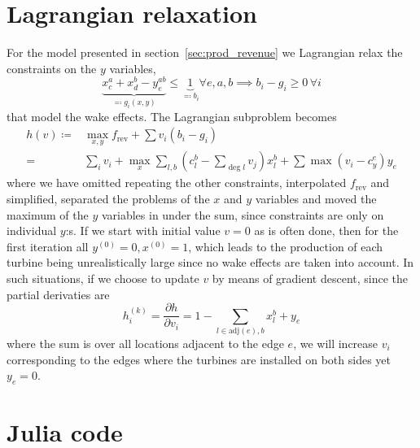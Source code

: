 \documentclass{article}
\begin{document}
\section{Lagrangian relaxation}
For the model presented in section~\ref{sec:prod_revenue}
we Lagrangian relax the constraints on the $y$ variables,
$$ \underbrace{x_c^a + x_d^b - y_e^{ab}}_{\eqqcolon g_i(x, y)} \le \underbrace1_{\eqqcolon b_i} \forall e, a, b \implies b_i - g_i \ge 0 \, \forall i$$
that model the wake effects.
The Lagrangian subproblem becomes
\begin{align*}
	h(v) \coloneqq& \max_{x,y} f_\text{rev} + \sum v_i (b_i - g_i) \\
	=& \sum_i v_i + \max_x \sum_{l, b} (c_l^b - \sum_{\deg l} v_j) x_l^b + \sum \max (v_i - c_y^e) y_e
\end{align*}
where we have omitted repeating the other constraints,
interpolated $f_\text{rev}$ and simplified,
separated the problems of the $x$ and $y$ variables
and moved the maximum of the $y$ variables in under the sum,
since constraints are only on individual $y$:s.
If we start with initial value $v=0$ as is often done,
then for the first iteration all $y^{(0)}=0, x^{(0)}=1$,
which leads to the production of each turbine being unrealistically large
since no wake effects are taken into account.
In such situations, if we choose to update $v$ by means of gradient descent,
since the partial derivaties are
$$ h_i^{(k)} = \frac{\partial h}{\partial v_i} = 1 - \sum_{l \in \text{adj}(e), b} x_l^b + y_e $$
where the sum is over all locations adjacent to the edge $e$,
we will increase $v_i$ corresponding to the edges
where the turbines are installed on both sides yet $y_e=0$.

\appendix
\section{Julia code}\label{app:code}
% 

\end{document}
